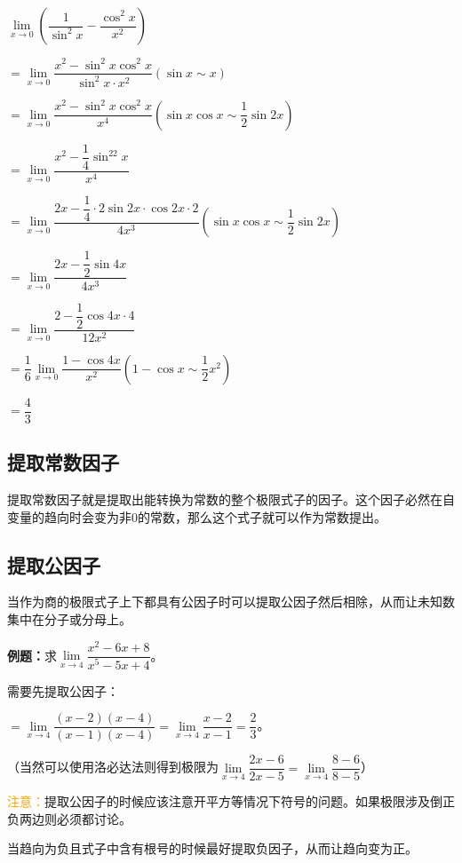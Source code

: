 \documentclass[UTF8, 12pt]{ctexart}
\begin{document}
$\lim\limits_{x\to 0}\left(\dfrac{1}{\sin^2x}-\dfrac{\cos^2x}{x^2}\right)$ \medskip

$= \lim\limits_{x\to 0}\dfrac{x^2-\sin^2x\cos^2x}{\sin^2x\cdot x^2} (\sin x\sim x)$ \medskip

$= \lim\limits_{x\to 0}\dfrac{x^2-\sin^2x\cos^2x}{x^4} (\sin x\cos x\sim\dfrac{1}{2}\sin 2x)$ \medskip

$= \lim\limits_{x\to 0}\dfrac{x^2-\dfrac{1}{4}\sin^22x}{x^4}$ \medskip

$= \lim\limits_{x\to 0}\dfrac{2x-\dfrac{1}{4}\cdot 2\sin 2x\cdot\cos 2x\cdot 2}{4x^3} (\sin x\cos x\sim\dfrac{1}{2}\sin 2x)$ \medskip

$= \lim\limits_{x\to 0}\dfrac{2x-\dfrac{1}{2}\sin 4x}{4x^3}$ \medskip

$= \lim\limits_{x\to 0}\dfrac{2-\dfrac{1}{2}\cos 4x\cdot 4}{12x^2}$ \medskip

$= \dfrac{1}{6}\lim\limits_{x\to 0}\dfrac{1-\cos 4x}{x^2} (1-\cos x\sim \dfrac{1}{2}x^2)$ \medskip

$= \dfrac{4}{3}$

\subsection{提取常数因子}

提取常数因子就是提取出能转换为常数的整个极限式子的因子。这个因子必然在自变量的趋向时会变为非0的常数，那么这个式子就可以作为常数提出。

\subsection{提取公因子}

当作为商的极限式子上下都具有公因子时可以提取公因子然后相除，从而让未知数集中在分子或分母上。

\textbf{例题：}求$\lim\limits_{x\to 4}\dfrac{x^2-6x+8}{x^5-5x+4}$。

需要先提取公因子：

$=\lim\limits_{x\to 4}\dfrac{(x-2)(x-4)}{(x-1)(x-4)}=\lim\limits_{x\to 4}\dfrac{x-2}{x-1}=\dfrac{2}{3}$。

（当然可以使用洛必达法则得到极限为$\lim\limits_{x\to 4}\dfrac{2x-6}{2x-5}=\lim\limits_{x\to 4}\dfrac{8-6}{8-5}$）

\textcolor{orange}{注意：}提取公因子的时候应该注意开平方等情况下符号的问题。如果极限涉及倒正负两边则必须都讨论。

当趋向为负且式子中含有根号的时候最好提取负因子，从而让趋向变为正。\medskip
\end{document}
